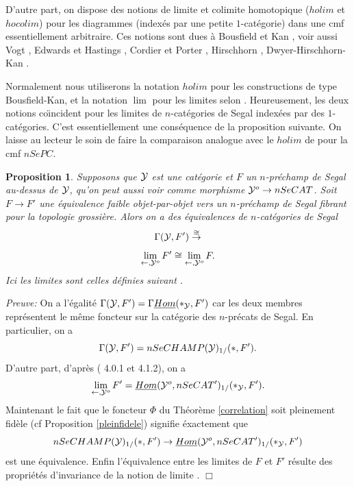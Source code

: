 \documentclass[12pt]{article}
\newcommand{\eop}{\hfill $\Box$\vspace{.1in}}
\newtheorem{proposition}[lemma]{Proposition}
\newcommand{\Yy}{{\cal Y}}
\begin{document}
D'autre part, on dispose des notions de
limite et colimite homotopique ($holim$ et $hocolim$) pour les
diagrammes (index\'es par une petite $1$-cat\'egorie) dans une cmf
essentiellement arbitraire. Ces notions
sont dues \`a Bousfield et Kan \cite{BousfieldKan},
voir aussi 
Vogt \cite{Vogt}, Edwards et Hastings \cite{EH},
Cordier et Porter \cite{CordierPorter2},
Hirschhorn \cite{Hirschhorn}, 
Dwyer-Hirschhorn-Kan \cite{DHK}.




Normalement nous utiliserons la notation $holim$ pour les
constructions de type Bous\-field-Kan, et la notation $\lim$ pour les
limites selon \cite{limits}. Heureusement, les deux notions co\"{\i}ncident
pour les limites de $n$-cat\'egories de Segal index\'ees par des
$1$-cat\'egories. C'est essentiellement une cons\'equence de la proposition
suivante. On laisse au lecteur le soin
de faire la comparaison analogue avec le $holim$ de
\cite{Hirschhorn} pour la cmf $nSePC$.

\begin{proposition}
\label{calclim}
Supposons que $\Yy$ est une cat\'egorie et $F$ un $n$-pr\'echamp de Segal
au-dessus de $\Yy$, qu'on peut aussi voir comme morphisme
$\Yy ^o\rightarrow nSeCAT$. Soit $F\rightarrow F'$ une \'equivalence faible
objet-par-objet vers un $n$-pr\'echamp de Segal fibrant pour la topologie
grossi\`ere. Alors on a des \'equivalences de $n$-cat\'egories de Segal
$$
\Gamma (\Yy , F')
\stackrel{\cong}{\rightarrow}
$$
$$
\lim _{\leftarrow , \Yy ^o} F' \cong
\lim _{\leftarrow , \Yy ^o} F .
$$
Ici les limites
sont celles d\'efinies suivant \cite{limits}.
\end{proposition}
{\em Preuve:}
On a
l'\'egalit\'e
$\Gamma (\Yy , F')=\Gamma \underline{Hom}(\ast _{\Yy}, F')$ car
les deux membres
repr\'esentent le m\^eme foncteur sur la cat\'egorie
des $n$-pr\'ecats de Segal.
En particulier, on a
$$
\Gamma (\Yy , F')= nSeCHAMP (\Yy )_{1/}(\ast, F').
$$
D'autre part, d'apr\`es (\cite{limits} 4.0.1 et 4.1.2), on a
$$
\lim _{\leftarrow , \Yy ^o} F' = \underline{Hom}(\Yy ^o, nSeCAT')_{1/} (\ast
_{\Yy}, F').
$$
Maintenant le fait que le foncteur $\Phi$ du Th\'eor\`eme
\ref{correlation} soit pleinement fid\`ele (cf Proposition \ref{pleinfidele})
signifie \'exactement que
$$
nSeCHAMP (\Yy )_{1/}(\ast, F')\rightarrow
\underline{Hom}(\Yy ^o, nSeCAT')_{1/} (\ast
_{\Yy}, F')
$$
est une \'equivalence. Enfin l'\'equivalence entre les limites de $F$ et $F'$
r\'esulte des propri\'et\'es d'invariance de la notion de limite
\cite{limits}.
\eop
\end{document}
